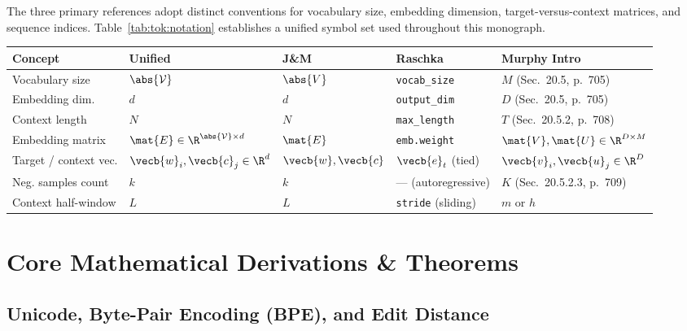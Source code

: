 \documentclass[../../../../master.tex]{subfiles}
\begin{document}
\begin{crossbook}
The three primary references adopt distinct conventions for vocabulary size, embedding dimension, target-versus-context matrices, and sequence indices. Table~\ref{tab:tok:notation} establishes a unified symbol set used throughout this monograph.
\par\medskip
\noindent
\begin{tabularx}{\linewidth}{@{}l l l l X@{}}
  \toprule
  \textbf{Concept} & \textbf{Unified} & \textbf{J\&M} & \textbf{Raschka} & \textbf{Murphy Intro} \\
  \midrule
  Vocabulary size & $\abs{\mathcal{V}}$ & $\abs{V}$ & \texttt{vocab\_size} & $M$ (Sec.~20.5, p.~705) \\
  Embedding dim. & $d$ & $d$ & \texttt{output\_dim} & $D$ (Sec.~20.5, p.~705) \\
  Context length & $N$ & $N$ & \texttt{max\_length} & $T$ (Sec.~20.5.2, p.~708) \\
  Embedding matrix & $\mat{E} \in \R^{\abs{\mathcal{V}}\times d}$ & $\mat{E}$ & \texttt{emb.weight} & $\mat{V}, \mat{U} \in \R^{D \times M}$ \\
  Target / context vec. & $\vecb{w}_i, \vecb{c}_j \in \R^d$ & $\vecb{w}, \vecb{c}$ & $\vecb{e}_t$ (tied) & $\vecb{v}_i, \vecb{u}_j \in \R^D$ \\
  Neg. samples count & $k$ & $k$ & --- (autoregressive) & $K$ (Sec.~20.5.2.3, p.~709) \\
  Context half-window & $L$ & $L$ & \texttt{stride} (sliding) & $m$ or $h$ \\
  \bottomrule
\end{tabularx}
\label{tab:tok:notation}
\end{crossbook}

\section{Core Mathematical Derivations \& Theorems}
\label{sec:tok:derivations}

\subsection{Unicode, Byte-Pair Encoding (BPE), and Edit Distance}
\end{document}
